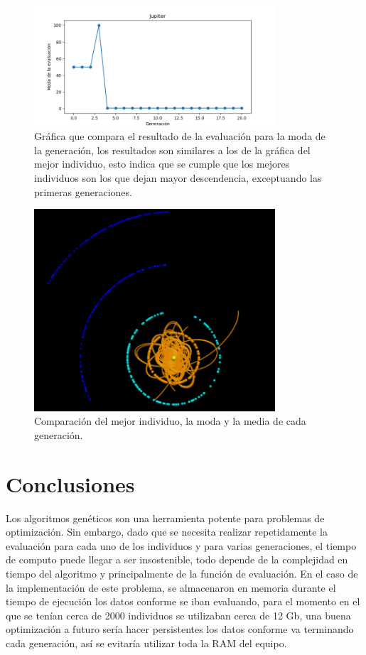 \documentclass[12pt,letterpaper]{article}
\begin{document}
\begin{figure}[H]
\centering
\includegraphics[width=0.8\textwidth]{Jupitermoda}
\caption{Gráfica que compara el resultado de la evaluación para la moda de la generación, los resultados son similares a los de la gráfica del mejor individuo, esto indica que se cumple que los mejores individuos son los que dejan mayor descendencia, exceptuando las primeras generaciones.}
\end{figure}

\begin{figure}[H]
\centering
\includegraphics[width=0.8\textwidth]{Jupiter}
\caption{Comparación del mejor individuo, la moda y la media de cada generación.}
\end{figure}


\section*{Conclusiones}

Los algoritmos genéticos son una herramienta potente para problemas de optimización. Sin embargo, dado que se necesita realizar repetidamente la evaluación para cada uno de los individuos y para varias generaciones, el tiempo de computo puede llegar a ser insostenible, todo depende de la complejidad en tiempo del algoritmo y principalmente de la función de evaluación. En el caso de la implementación de este problema, se almacenaron en memoria durante el tiempo de ejecución los datos conforme se iban evaluando, para el momento en el que se tenían cerca de 2000 individuos se utilizaban cerca de 12 Gb, una buena optimización a futuro sería hacer persistentes los datos conforme va terminando cada generación, así se evitaría utilizar toda la RAM del equipo.
\end{document}
